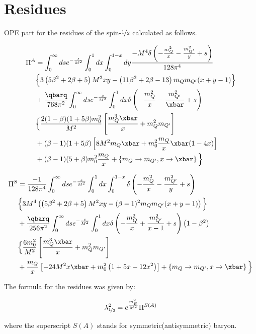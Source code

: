 \label{chp:appndxc}
\section{Residues}
OPE part for the residues of the spin-$\nicefrac{1}{2}$ calculated as follows.

\begin{equation}
        \begin{aligned}
            \Pi^A &= \int_0^\infty ds  e^{-\frac{s}{M^2}} \int_0^1 dx \int_0^{1-x} dy\dfrac{-M^4 \delta\left(-\frac{m_Q^2}{x}-\frac{m_{Q^\prime}^2}{y}+s\right)}{128 \pi ^4}\\
            &\Big\{3 \left(5 \beta ^2+2 \beta +5\right) M^2 x y-\left(11 \beta ^2+2 \beta-13\right)m_Q m_{Q^\prime} (x+y-1)\Big\}\\
            &+\dfrac{\qbarq}{768\pi^2} \int_0^\infty ds  e^{-\frac{s}{M^2}} \int_0^1 dx \delta\left(-\frac{m_Q^2}{x}-\frac{m_{Q^\prime}^2}{\xbar}+s\right)\\
            &\Big\{\dfrac{2(1-\beta)(1+5\beta)m_0^2}{M^2}\left[\dfrac{m_Q^3\xbar}{x}+m_Q^2m_{Q^\prime}\right]\\
            &+(\beta-1)(1+5\beta)\left[8M^2m_Q\xbar+m_0^2\dfrac{m_Q}{x}\xbar(1-4x)\right]\\
            &+(\beta-1)(5+\beta)m_0^2\dfrac{m_Q}{x}+\left\{m_Q \rightarrow m_{Q^\prime}, x \rightarrow \xbar\right\}\Big\}
        \end{aligned}
    \end{equation}

    \begin{equation}
        \begin{aligned}
            \Pi^S &= \dfrac{-1}{{128 \pi ^4}}\int_0^\infty ds e^{-\frac{s}{M^2}} \int_0^1 dx \int_0^{1-x} \delta\left(-\frac{m_Q^2}{x}-\frac{m_{Q^\prime}^2}{y}+s\right) \\
            &\Big\{3 M^4 \left(\left(5 \beta ^2+2 \beta +5\right) M^2 x y-(\beta-1)^2 m_Q m_{Q^\prime} (x+y-1)\right)\Big\} \\
            &+\dfrac{\qbarq }{256 \pi^2} \int_0^\infty ds e^{-\frac{s}{M^2}} \int_0^1 dx \delta\left(-\frac{m_Q^2}{x}+\frac{m_{Q^\prime}^2}{x-1}+s\right)\left(1-\beta^2\right)\\
            &\Big\{\dfrac{6m_0^2}{M^2}\left[\dfrac{m_Q^3\xbar}{x}+m_Q^2m_{Q^\prime}\right]\\
            &+\dfrac{m_Q}{x}\left[-24M^2x\xbar+m_0^2\left(1+5x-12x^2\right)\right]+\left\{m_Q \rightarrow m_{Q^\prime}, x \rightarrow \xbar\right\}\Big\}
        \end{aligned}
    \end{equation}

    The formula for the residues was given by:

    \begin{equation}
        \lambda_{\nicefrac{1}{2}}^2 = e^{\frac{m_B^2}{M^2}} \Pi^{S(A)} 
    \end{equation}

    where the superscript $S(A)$ stands for symmetric(antisymmetric) baryon.